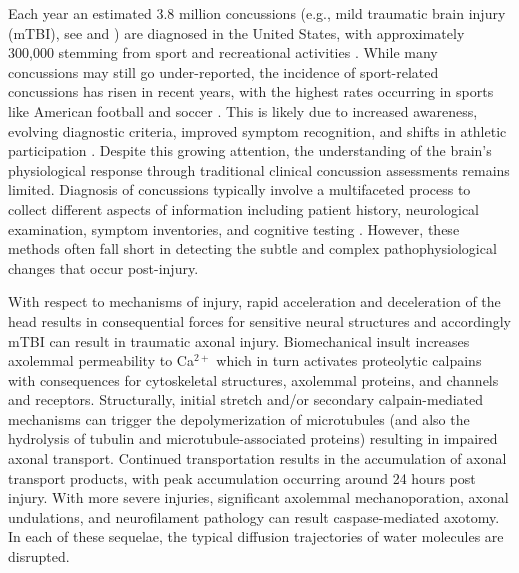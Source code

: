 \documentclass[12pt]{article}
\begin{document}
Each year an estimated 3.8 million concussions (e.g., mild traumatic brain injury (mTBI), see \textcite{mayer2017SpectrumMildTraumatic} and \textcite{silverberg2023AmericanCongressRehabilitation}) are diagnosed in the United States, with approximately 300,000 stemming from sport and recreational activities \parencite{langlois2006EpidemiologyImpactTraumatic,coronado2015TrendsSportsRecreationRelated}. While many concussions may still go under-reported, the incidence of sport-related concussions has risen in recent years, with the highest rates occurring in sports like American football and soccer \parencite{pierpoint2021EpidemiologySportRelatedConcussion}. This is likely due to increased awareness, evolving diagnostic criteria, improved symptom recognition, and shifts in athletic participation \parencite{yang2017NewRecurrentConcussions}. Despite this growing attention, the understanding of the brain's physiological response through traditional clinical concussion assessments remains limited. Diagnosis of concussions typically involve a multifaceted process to collect different aspects of information including patient history, neurological examination, symptom inventories, and cognitive testing \parencite{patricios2023ConsensusStatementConcussion}. However, these methods often fall short in detecting the subtle and complex pathophysiological changes that occur post-injury.

With respect to mechanisms of injury, rapid acceleration and deceleration of the head results in consequential forces for sensitive neural structures and accordingly mTBI can result in traumatic axonal injury. Biomechanical insult increases axolemmal permeability to Ca$^{2+}$ which in turn activates proteolytic calpains with consequences for cytoskeletal structures, axolemmal proteins, and channels and receptors. Structurally, initial stretch and/or secondary calpain-mediated mechanisms can trigger the depolymerization of microtubules (and also the hydrolysis of tubulin and microtubule-associated proteins) resulting in impaired axonal transport. Continued transportation results in the accumulation of axonal transport products, with peak accumulation occurring around 24 hours post injury. With more severe injuries, significant axolemmal mechanoporation, axonal undulations, and neurofilament pathology can result caspase-mediated axotomy. In each of these sequelae, the typical diffusion trajectories of water molecules are disrupted.
\end{document}
